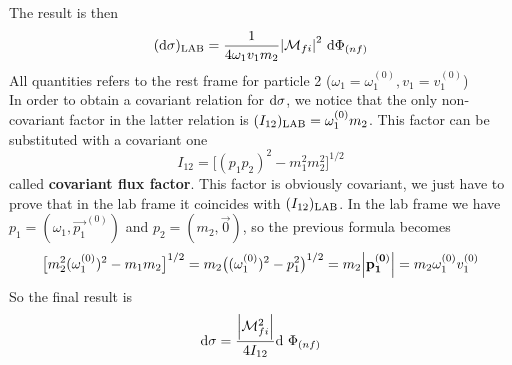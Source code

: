 \documentclass[TheoreticalPhy_ModB.tex]{subfiles}
\begin{document}
The result is then
\[
(\textup{d} \sigma)_{\textup{LAB}} = \frac{1}{4 \omega_1 v_1 m_2} \abs{\mathcal{M}_{fi}}^2 \ \textup{d} \Phi_{(nf)}
\]
All quantities refers to the rest frame for particle 2 ($\omega_1 = \omega_1^{(0)}, v_1 = v_1^{(0)}$)\\
In order to obtain a covariant relation for $\textup{d} \sigma$, we notice that the only non-covariant factor in the latter relation is $(I_{12})_{\textup{LAB}} = \omega_1^{(0)} m_2$. This factor can be substituted with a covariant one
\[
I_{12} = \bigl[ (p_1 p_2)^2 - m_1^2 m_2^2 \bigr]^{1/2}
\]
called \textbf{covariant flux factor}. This factor is obviously covariant, we just have to prove that in the lab frame it coincides with $(I_{12})_{\textup{LAB}}$.
In the lab frame we have $p_1 = (\omega_1, \vec{p_1}^{(0)})$ and $p_2 = (m_2, \vec{0})$, so the previous formula becomes
\[
\bigl[ m_2^2 (\omega_1^{(0)})^2 - m_1 m_2 \bigr]^{1/2} = m_2 \bigl( (\omega_1^{(0)})^2 - p_1^2 \bigr)^{1/2} = m_2 \abs{\mathbf{p_1^{(0)}}}
	= m_2 \omega_1^{(0)} v_1^{(0)}
\]
So the final result is
\[
\textup{d} \sigma = \frac{\abs{\mathcal{M}_{fi}^2}}{4 I_{12}} \textup{d} \ \Phi_{(nf)}
\]
\end{document}

